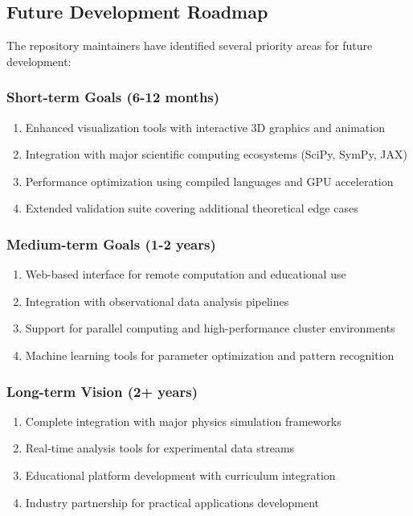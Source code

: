 \subsection{Future Development Roadmap}
\label{subsec:development_roadmap}

The repository maintainers have identified several priority areas for future development:

\subsubsection{Short-term Goals (6-12 months)}

\begin{enumerate}
\item Enhanced visualization tools with interactive 3D graphics and animation
\item Integration with major scientific computing ecosystems (SciPy, SymPy, JAX)
\item Performance optimization using compiled languages and GPU acceleration
\item Extended validation suite covering additional theoretical edge cases
\end{enumerate}

\subsubsection{Medium-term Goals (1-2 years)}

\begin{enumerate}
\item Web-based interface for remote computation and educational use
\item Integration with observational data analysis pipelines
\item Support for parallel computing and high-performance cluster environments
\item Machine learning tools for parameter optimization and pattern recognition
\end{enumerate}

\subsubsection{Long-term Vision (2+ years)}

\begin{enumerate}
\item Complete integration with major physics simulation frameworks
\item Real-time analysis tools for experimental data streams
\item Educational platform development with curriculum integration
\item Industry partnership for practical applications development
\end{enumerate}

